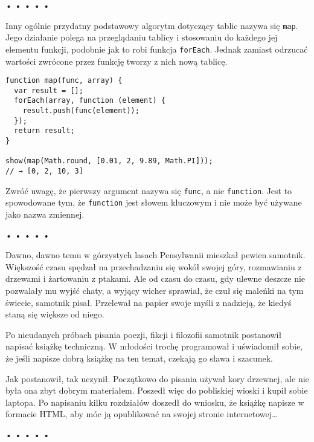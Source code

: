 \begin{center}
• • • • •
\end{center}

  
Inny ogólnie przydatny podstawowy algorytm dotyczący tablic nazywa się \texttt{map}. Jego działanie polega na przeglądaniu tablicy i stosowaniu do każdego jej elementu funkcji, podobnie jak to robi funkcja \texttt{forEach}. Jednak zamiast odrzucać wartości zwrócone przez funkcję tworzy z nich nową tablicę.

  
\begin{verbatim} 
function map(func, array) {
  var result = [];
  forEach(array, function (element) {
    result.push(func(element));
  });
  return result;
}

show(map(Math.round, [0.01, 2, 9.89, Math.PI]));
// → [0, 2, 10, 3]
\end{verbatim}
  
Zwróć uwagę, że pierwszy argument nazywa się \texttt{func}, a nie \texttt{function}. Jest to spowodowane tym, że \texttt{function} jest słowem kluczowym i nie może być używane jako nazwa zmiennej.



\begin{center}
• • • • •
\end{center}

  
Dawno, dawno temu w górzystych lasach Pensylwanii mieszkał pewien samotnik. Większość czasu spędzał na przechadzaniu się wokół swojej góry, rozmawianiu z drzewami i żartowaniu z ptakami. Ale od czasu do czasu, gdy ulewne deszcze nie pozwalały mu wyjść chaty, a wyjący wicher sprawiał, że czuł się maleńki na tym świecie, samotnik pisał. Przelewał na papier swoje myśli z nadzieją, że kiedyś staną się większe od niego.

  
Po nieudanych próbach pisania poezji, fikcji i filozofii samotnik postanowił napisać książkę techniczną. W młodości trochę programował i uświadomił sobie, że jeśli napisze dobrą książkę na ten temat, czekają go sława i szacunek.

  
Jak postanowił, tak uczynił. Początkowo do pisania używał kory drzewnej, ale nie była ona zbyt dobrym materiałem. Poszedł więc do pobliskiej wioski i kupił sobie laptopa. Po napisaniu kilku rozdziałów doszedł do wniosku, że książkę napisze w formacie HTML, aby móc ją opublikować na swojej stronie internetowej…



\begin{center}
• • • • •
\end{center}

